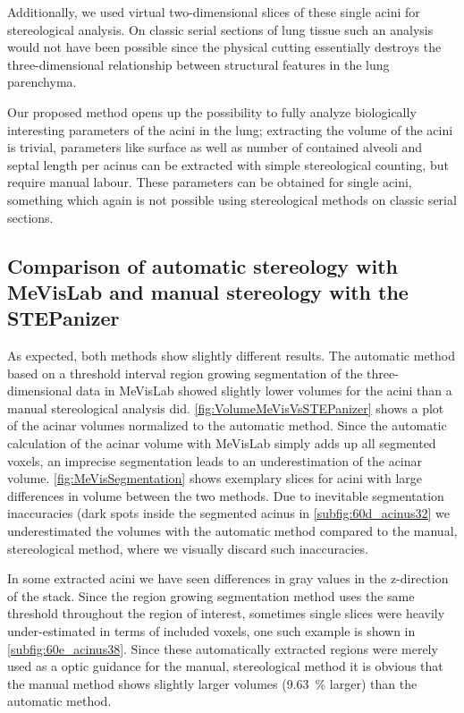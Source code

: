 \documentclass[%
	paper=a4,%
	abstract=true,%
	]{scrartcl}
\begin{document}
Additionally, we used virtual two-dimensional slices of these single acini for stereological analysis. On classic serial sections of lung tissue such an analysis would not have been possible since the physical cutting essentially destroys the three-dimensional relationship between structural features in the lung parenchyma.

Our proposed method opens up the possibility to fully analyze biologically interesting parameters of the acini in the lung; extracting the volume of the acini is trivial, parameters like surface as well as number of contained alveoli and septal length per acinus can be extracted with simple stereological counting, but require manual labour. These parameters can be obtained for single acini, something which again is not possible using stereological methods on classic serial sections.

\subsection[Comparison of MeVisLab with STEPanizer]{Comparison of automatic stereology with MeVisLab and manual stereology with the STEPanizer}
As expected, both methods show slightly different results. The automatic method based on a threshold interval region growing segmentation of the three-dimensional data in MeVisLab showed slightly lower volumes for the acini than a manual stereological analysis did. \autoref{fig:VolumeMeVisVsSTEPanizer} shows a plot of the acinar volumes normalized to the automatic method. Since the automatic calculation of the acinar volume with MeVisLab simply adds up all segmented voxels, an imprecise segmentation leads to an underestimation of the acinar volume. \autoref{fig:MeVisSegmentation} shows exemplary slices for acini with large differences in volume between the two methods. Due to inevitable segmentation inaccuracies (dark spots inside the segmented acinus in \autoref{subfig:60d_acinus32} we underestimated the volumes with the automatic method compared to the manual, stereological method, where we visually discard such inaccuracies.

In some extracted acini we have seen differences in gray values in the z-direction of the stack. Since the region growing segmentation method uses the same threshold throughout the region of interest, sometimes single slices were heavily under-estimated in terms of included voxels, one such example is shown in \autoref{subfig:60e_acinus38}. Since these automatically extracted regions were merely used as a optic guidance for the manual, stereological method it is obvious that the manual method shows slightly larger volumes (\SI{9.63}{\percent} larger) than the automatic method.
\end{document}
